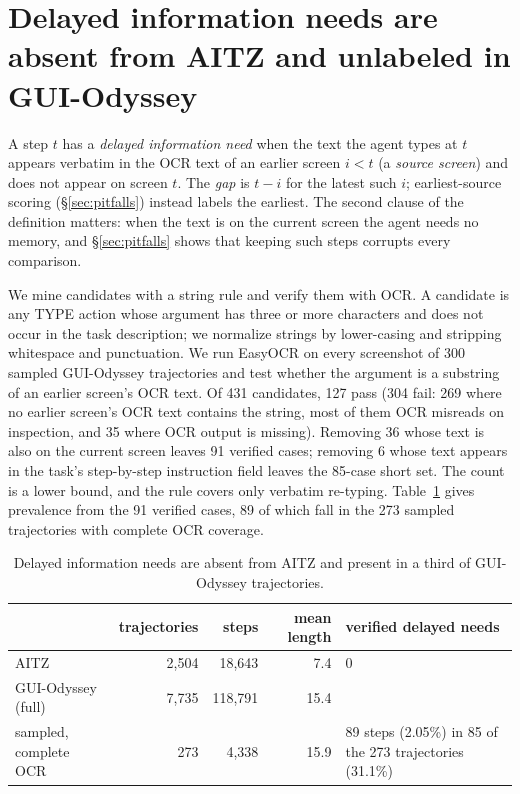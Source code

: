 \section{Delayed information needs are absent from AITZ and unlabeled in GUI-Odyssey}
\label{sec:needs}
A step $t$ has a \emph{delayed information need} when the text the agent types at $t$ appears verbatim in the OCR text of an earlier screen $i<t$ (a \emph{source screen}) and does not appear on screen $t$. The \emph{gap} is $t-i$ for the latest such $i$; earliest-source scoring (\S\ref{sec:pitfalls}) instead labels the earliest. The second clause of the definition matters: when the text is on the current screen the agent needs no memory, and \S\ref{sec:pitfalls} shows that keeping such steps corrupts every comparison.

We mine candidates with a string rule and verify them with OCR. A candidate is any TYPE action whose argument has three or more characters and does not occur in the task description; we normalize strings by lower-casing and stripping whitespace and punctuation. We run EasyOCR on every screenshot of 300 sampled GUI-Odyssey trajectories and test whether the argument is a substring of an earlier screen's OCR text. Of 431 candidates, 127 pass (304 fail: 269 where no earlier screen's OCR text contains the string, most of them OCR misreads on inspection, and 35 where OCR output is missing). Removing 36 whose text is also on the current screen leaves 91 verified cases; removing 6 whose text appears in the task's step-by-step instruction field leaves the 85-case short set. The count is a lower bound, and the rule covers only verbatim re-typing. Table~\ref{tab:prev} gives prevalence from the 91 verified cases, 89 of which fall in the 273 sampled trajectories with complete OCR coverage.

\begin{table}[t]
\centering\footnotesize
\caption{Delayed information needs are absent from AITZ and present in a third of GUI-Odyssey trajectories.}
\label{tab:prev}
\begin{tabular}{lrrrl}
\toprule
 & trajectories & steps & mean length & verified delayed needs \\
\midrule
AITZ~\citep{aitz} & 2,504 & 18,643 & 7.4 & 0 \\
GUI-Odyssey~\citep{guiodyssey} (full) & 7,735 & 118,791 & 15.4 & \\
\quad sampled, complete OCR & 273 & 4,338 & 15.9 & 89 steps (2.05\%) in 85 of the 273 trajectories (31.1\%) \\
\bottomrule
\end{tabular}
\end{table}

